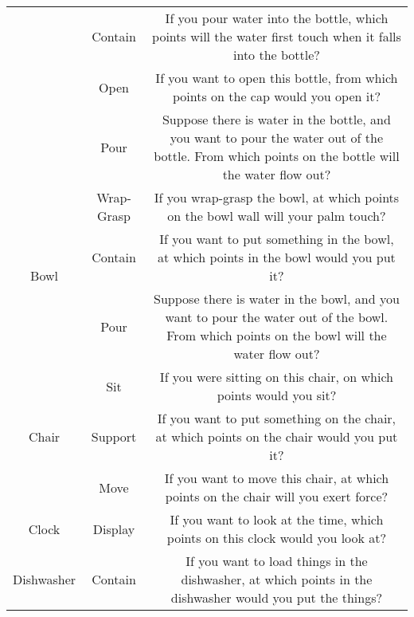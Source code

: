 \documentclass[final]{cvpr}
\begin{document}
\begin{table*}[t]
{\begin{tabular}{c|c|c}
                                      & Contain             & If you pour water into the bottle, which points will the water first touch when it falls into the bottle?                                        \\
                                      & Open                & If you want to open this bottle, from which points on the cap would you open it?                                                                 \\
                                      & Pour                & Suppose there is water in the bottle, and you want to pour the water out of the bottle. From which points on the bottle will the water flow out? \\ \hline
    \multirow{3}{*}{Bowl}             & Wrap-Grasp          & If you wrap-grasp the bowl, at which points on the bowl wall will your palm touch?                                                               \\
                                      & Contain             & If you want to put something in the bowl, at which points in the bowl would you put it?                                                          \\
                                      & Pour                & Suppose there is water in the bowl, and you want to pour the water out of the bowl. From which points on the bowl will the water flow out?       \\ \hline
    \multirow{3}{*}{Chair}            & Sit                 & If you were sitting on this chair, on which points would you sit?                                                                                \\
                                      & Support             & If you want to put something on the chair, at which points on the chair would you put it?                                                        \\
                                      & Move                & If you want to move this chair, at which points on the chair will you exert force?                                                               \\ \hline
    Clock                             & Display             & If you want to look at the time, which points on this clock would you look at?                                                                   \\ \hline
    \multirow{2}{*}{Dishwasher}       & Contain             & If you want to load things in the dishwasher, at which points in the dishwasher would you put the things?                                        \\

\end{tabular}}
\end{table*}
\end{document}
